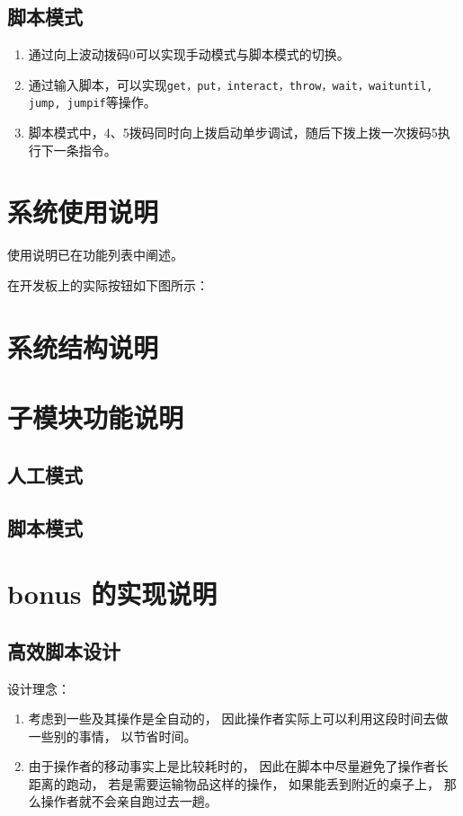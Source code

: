 \documentclass[12pt, a4paper]{ctexart}
\begin{document}
\subsection{脚本模式}
\begin{enumerate}
	\item 通过向上波动拨码0可以实现手动模式与脚本模式的切换。
	\item 通过输入脚本，可以实现\texttt{get，put，interact，throw，wait，waituntil, jump, jumpif}等操作。
	\item 脚本模式中，4、5拨码同时向上拨启动单步调试，随后下拨上拨一次拨码5执行下一条指令。
\end{enumerate}

\section{系统使用说明}

使用说明已在功能列表中阐述。

在开发板上的实际按钮如下图所示：

\section{系统结构说明}

\section{子模块功能说明}
\subsection{人工模式}

\subsection{脚本模式}

\section{bonus 的实现说明}

\subsection{高效脚本设计}
设计理念：
\begin{enumerate}
\item 考虑到一些及其操作是全自动的，
因此操作者实际上可以利用这段时间去做一些别的事情，
以节省时间。
\item 由于操作者的移动事实上是比较耗时的，
因此在脚本中尽量避免了操作者长距离的跑动，
若是需要运输物品这样的操作，
如果能丢到附近的桌子上，
那么操作者就不会亲自跑过去一趟。
\end{enumerate}
\end{document}

